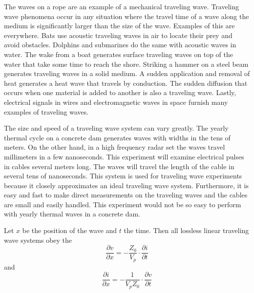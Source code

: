 \documentclass[12pt, a4paper, oneside, openright, titlepage]{book}
\begin{document}
\noindent The waves on a rope are an example of a mechanical traveling wave. Traveling wave phenomena occur in any situation where the travel time of a wave along the medium is significantly larger than the size of the wave. Examples of this are everywhere. Bats use acoustic traveling waves in air to locate their prey and avoid obstacles. Dolphins and submarines do the same with acoustic waves in water. The wake from a boat generates surface traveling waves on top of the water that take some time to reach the shore. Striking a hammer on a steel beam generates traveling waves in a solid medium. A sudden application and removal of heat generates a heat wave that travels by conduction. The sudden diffusion that occurs when one material is added to another is also a traveling wave. Lastly, electrical signals in wires and electromagnetic waves in space furnish many examples of traveling waves.

\noindent The size and speed of a traveling wave system can vary greatly. The yearly thermal cycle on a concrete dam generates waves with widths in the tens of meters. On the other hand, in a high frequency radar set the waves travel millimeters in a few nanoseconds. This experiment will examine electrical pulses in cables several meters long. The waves will travel the length of the cable in several tens of nanoseconds. This system is used for traveling wave experiments because it closely approximates an ideal traveling wave system. Furthermore, it is easy and fast to make direct measurements on the traveling waves and the cables are small and easily handled. This experiment would not be so easy to perform with yearly thermal waves in a concrete dam.

\noindent Let $x$ be the position of the wave and $t$ the time. Then all lossless linear traveling wave systems obey the  \begin{equation}\label{eq:TW1}
    \frac{\partial v}{\partial x} = -\frac{Z_0}{V_p}\cdot\frac{\partial i}{\partial t}
\end{equation}
and \begin{equation}\label{eq:TW2}
    \frac{\partial i}{\partial x} = -\frac{1}{V_pZ_0}\cdot\frac{\partial v}{\partial t}
\end{equation}
\end{document}
